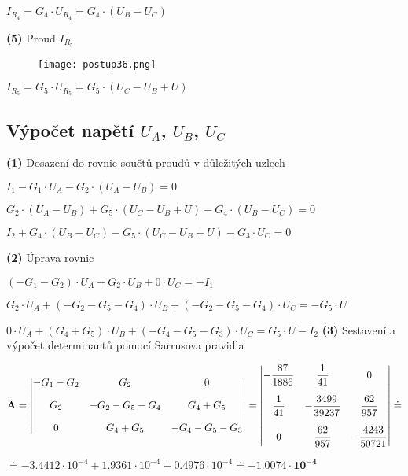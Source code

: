 \documentclass[a4paper,12pt]{article}
\begin{document}
$I_{R_4}=G_4\cdot U_{R_4}=G_4\cdot (U_B-U_C)$\par\vspace{6em}
\hspace{1em}\textbf{(5)} Proud $I_{R_5}$\par
\begin{wrapfigure}{l}{0.38\textwidth}
\vspace{-88pt}
\texttt{[image: postup36.png]}
\vspace{-78pt}
\end{wrapfigure}
\vspace{80pt}
\hspace{1em}$I_{R_5}=G_5\cdot U_{R_5}=G_5\cdot (U_C-U_B+U)$\par\vspace{4.8em}
\subsection{Výpočet napětí $U_A$, $U_B$, $U_C$}
\hspace{1em}\textbf{(1)} Dosazení do rovnic součtů proudů v důležitých uzlech\par
$I_1-G_1\cdot U_A-G_2\cdot (U_A-U_B)=0$\par
$G_2\cdot (U_A-U_B)+G_5\cdot (U_C-U_B+U)-G_4\cdot (U_B-U_C)=0$\par
$I_2+G_4\cdot (U_B-U_C)-G_5\cdot (U_C-U_B+U)-G_3\cdot U_C=0$\par\vspace{1em}
\hspace{1em}\textbf{(2)} Úprava rovnic\par
$(-G_1-G_2)\cdot U_A+G_2\cdot U_B+0\cdot U_C=-I_1$\par
$G_2\cdot U_A+(-G_2-G_5-G_4)\cdot U_B+(-G_2-G_5-G_4)\cdot U_C=-G_5\cdot U$\par
$0\cdot U_A+(G_4+G_5)\cdot U_B+(-G_4-G_5-G_3)\cdot U_C=G_5\cdot U-I_2$\newpage
\hspace{1em}\textbf{(3)} Sestavení a výpočet determinantů pomocí Sarrusova pravidla\par
$\mathbf{A}=\begin{vmatrix}
-G_1-G_2 & G_2 & 0 \vspace{1em}\\
G_2 & -G_2-G_5-G_4 & G_4+G_5 \vspace{1em}\\
0 & G_4+G_5 & -G_4-G_5-G_3
\end{vmatrix}
=\begin{vmatrix}
-\dfrac{87}{1886} & \dfrac{1}{41} & 0 \vspace{1em}\\
\dfrac{1}{41} & -\dfrac{3499}{39237} & \dfrac{62}{957} \vspace{1em}\\
0 & \dfrac{62}{957} & -\dfrac{4243}{50721}
\end{vmatrix}\doteq$\par\vspace{0.5em}\hspace{12pt}$\doteq -3.4412\cdot10^{-4}+1.9361\cdot 10^{-4}+0.4976\cdot 10^{-4}\doteq \mathbf{-1.0074\cdot 10^{-4}}$\par\vspace{2em}
\end{document}
